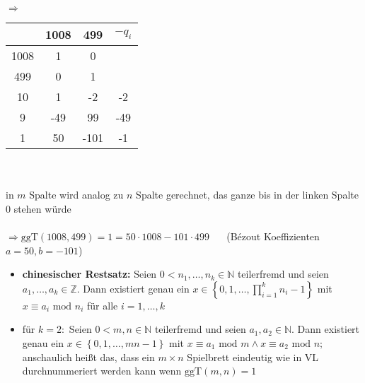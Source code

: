 \documentclass[10pt,a4paper]{article}
\begin{document}
\hspace{0.1cm} $\Rightarrow$\hspace{0.2cm}
\begin{tabular}{ c | c c | c }
   & 1008 & 499 & $-q_{i}$ \\ 
 \hline
 1008 & 1 & 0 & \\  
 499 & 0 & 1 &  \\  
 10 & 1 & -2 & -2\\
 9 & -49 & 99 & -49  \\
 1 & 50 & -101 & -1 \\
\end{tabular} \\\\
in $m$ Spalte wird analog zu $n$ Spalte gerechnet, das ganze bis in der linken Spalte 0 stehen würde \\\\
$\Rightarrow \text{ggT}(1008,499)=1=50\cdot 1008 -101\cdot 499\;\;\;\;\;$ (Bézout Koeffizienten $a=50, b=-101$)
\begin{itemize}
\item \textbf{chinesischer Restsatz:} Seien $0<n_{1},\dotsc ,n_{k}\in \mathbb{N}$ teilerfremd und seien $a_{1},\dotsc ,a_{k} \in \mathbb{Z}$. Dann existiert genau ein $x\in \left\lbrace 0,1,\dotsc,\prod_{i=1}^{k} n_{i}-1\right\rbrace$ mit $x\equiv a_{i} \text{ mod } n_{i}$ für alle $i=1,\dotsc, k$
\item für $k=2:$ Seien $0<m,n\in \mathbb{N}$ teilerfremd und seien $a_{1},a_{2} \in \mathbb{N}$. Dann existiert genau ein $x\in \left\lbrace 0,1,\dotsc,mn-1\right\rbrace$ mit $x\equiv a_{1} \text{ mod } m \land x\equiv a_{2} \text{ mod } n;\;$ anschaulich heißt das, dass ein $m\times n$ Spielbrett eindeutig wie in VL durchnummeriert werden kann wenn $\text{ggT}(m,n)=1$


\end{itemize}
\end{document}

